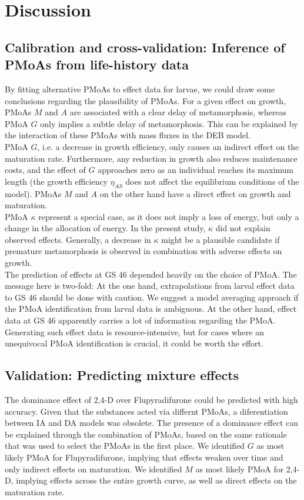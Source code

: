 \section{Discussion}

\subsection{Calibration and cross-validation: Inference of PMoAs from life-history data}
\noindent
By fitting alternative PMoAs to effect data for larvae, 
we could draw some conclusions regarding the plausibility of PMoAs. 
For a given effect on growth, 
PMoAs $M$ and $A$ are associated with a clear delay of metamorphosis, 
whereas PMoA $G$ only implies a subtle delay of metamorphosis. 
This can be explained by the interaction of these PMoAs with mass fluxes in the DEB model.\\
PMoA $G$, i.e. a decrease in growth efficiency, 
only causes an indirect effect on the maturation rate.
Furthermore, any reduction in growth also reduces maintenance costs, 
and the effect of $G$ approaches zero as an individual reaches its maximum length 
(the growth efficiency $\eta_{AS}$ does not affect the equilibrium conditions of the model).
PMoAs $M$ and $A$ on the other hand have a direct effect on growth and maturation.\\
PMoA $\kappa$ represent a special case, as it does not imply a loss of energy, 
but only a change in the allocation of energy. 
In the present study, $\kappa$ did not explain observed effects. 
Generally, a decrease in $\kappa$ might be a plausible candidate if premature metamorphosis is observed 
in combination with adverse effects on growth.\\
The prediction of effects at GS 46 depended heavily on the choice of PMoA. 
The message here is two-fold: 
At the one hand, extrapolations from larval effect data to GS 46 should be done with caution. 
We suggest a model averaging approach if the PMoA identification from larval data is ambiguous.
At the other hand, effect data at GS 46 apparently carries a lot of information regarding the PMoA. 
Generating such effect data is resource-intensive, but for cases where an unequivocal PMoA identification is crucial, 
it could be worth the effort. 
%
\subsection{Validation: Predicting mixture effects}
\noindent
The dominance effect of 2,4-D over Flupyradifurone could be predicted with high accuracy. 
Given that the substances acted via differnt PMoAs, a diferentiation between IA and DA models was obsolete. 
The presence of a dominance effect can be explained through the combination of PMoAs, 
based on the same rationale that was used to select the PMoAs in the first place. 
We identified $G$ as most likely PMoA for Flupyradifurone, 
implying that effects weaken over time and only indirect effects on maturation. 
We identified $M$ as most likely PMoA for 2,4-D, 
implying effects across the entire growth curve, as well as direct effects on the maturation rate. 
%
